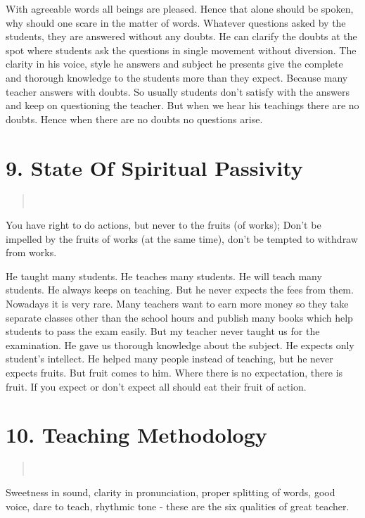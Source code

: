 \noindent
With agreeable words all beings are pleased. Hence that alone should be spoken, why should one scare in the matter of words.
Whatever questions asked by the students, they are answered without any doubts. He can clarify the doubts at the spot where students ask the questions in single movement without diversion. The clarity in his voice, style he answers and subject he presents give the complete and thorough knowledge to the students more than they expect. Because many teacher answers with doubts. So usually students don’t satisfy with the answers and keep on questioning the teacher. But when we hear his teachings there are no doubts. Hence when there are no doubts no questions arise.

\section*{9. State Of Spiritual Passivity }

\begin{verse}
\\
\end{verse}
You have right to do actions, but never to the fruits (of works); Don’t be impelled by the fruits of works (at the same time), don’t be tempted to withdraw from works.

He taught many students. He teaches many students. He will teach many students. He always keeps on teaching. But he never expects the fees from them. Nowadays it is very rare. Many teachers want to earn more money so they take separate classes other than the school hours and publish many books which help students to pass the exam easily. But my teacher never taught us for the examination. He gave us thorough knowledge about the subject. He expects only student’s intellect. He helped many people instead of teaching, but he never expects fruits. But fruit comes to him. Where there is no expectation, there is fruit. If you expect or don’t expect all should eat their fruit of action.

\section*{10. Teaching Methodology }

\begin{verse}
\\
\end{verse}
Sweetness in sound, clarity in pronunciation, proper splitting of words, good voice, dare to teach, rhythmic tone -  these are the six qualities of great teacher.

